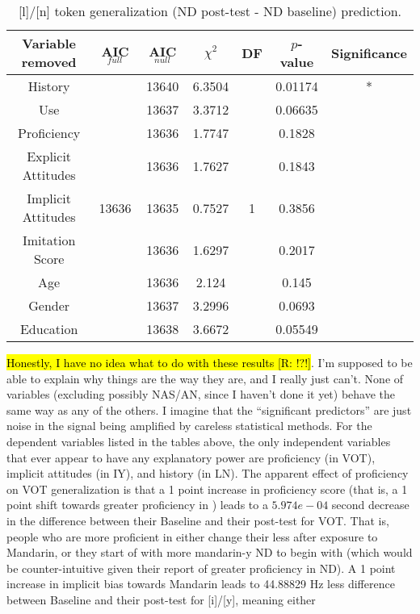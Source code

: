 \begin{table}
\centering
 \begin{tabular}{|c||c|c|c|c|c|c|} 
 \hline
 \textbf{Variable removed} & \textbf{AIC$_{full}$} & \textbf{AIC$_{null}$} & $\chi^2$ & \textbf{DF} & \textbf{$p$-value} & \textbf{Significance}\\ [0.5ex] 
 \hline
  History & \multirow{9}{*}{13636} & 13640 & 6.3504 & \multirow{9}{*}{1} & 0.01174 & *\\ 
 \cline{1-1}\cline{3-4}\cline{6-7}
 Use &  & 13637 & 3.3712 &  & 0.06635 & \\
 \cline{1-1}\cline{3-4}\cline{6-7}
 Proficiency &  & 13636 & 1.7747 &  & 0.1828 & \\
 \cline{1-1}\cline{3-4}\cline{6-7}
 Explicit Attitudes &  & 13636 & 1.7627 &  & 0.1843 & \\
 \cline{1-1}\cline{3-4}\cline{6-7}
 Implicit Attitudes &  & 13635 & 0.7527 &  & 0.3856 & \\
 \cline{1-1}\cline{3-4}\cline{6-7}
 Imitation Score &  & 13636 & 1.6297 &  & 0.2017 & \\
 \cline{1-1}\cline{3-4}\cline{6-7}
 Age &  & 13636 & 2.124 &  & 0.145 & \\
 \cline{1-1}\cline{3-4}\cline{6-7}
 Gender &  & 13637 & 3.2996 &  & 0.0693 & \\
 \cline{1-1}\cline{3-4}\cline{6-7}
 Education &  & 13638 & 3.6672 &  & 0.05549 & \\
 \hline
\end{tabular}
\caption{[l]/[n] token generalization (ND post-test - ND baseline) prediction.}
\label{tab:LNtokengnPredictors}
\end{table}

\hl{Honestly, I have no idea what to do with these results [R: !?!]}. I'm supposed to be able to explain why things are the way they are, and I really just can't. None of variables (excluding possibly NAS/AN, since I haven't done it yet) behave the same way as any of the others. I imagine that the ``significant predictors'' are just noise in the signal being amplified by careless statistical methods. For the dependent variables listed in the tables above, the only independent variables that ever appear to have any explanatory power are proficiency (in VOT), implicit attitudes (in IY), and history (in LN). The apparent effect of proficiency on VOT generalization is that a 1 point increase in proficiency score (that is, a 1 point shift towards greater proficiency in \ND{}) leads to a $5.974e-04$ second decrease in the difference between their \ND{} Baseline and their \ND{} post-test for VOT. That is, people who are more proficient in \ND{} either change their \ND{} less after exposure to Mandarin, or they start of with more mandarin-y ND to begin with (which would be counter-intuitive given their report of greater proficiency in ND). A 1 point increase in implicit bias towards Mandarin leads to 44.88829 Hz less difference between \ND{} Baseline and their \ND{} post-test for [i]/[y], meaning either 

